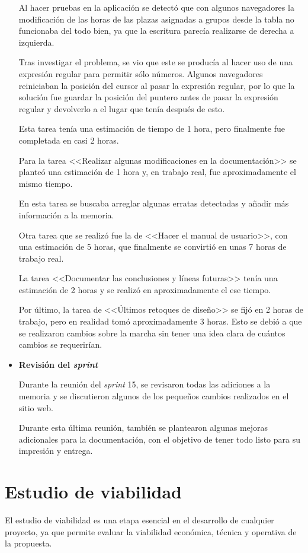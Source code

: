 \begin{itemize}
Al hacer pruebas en la aplicación se detectó que con algunos navegadores la modificación de las horas de las plazas asignadas a grupos desde la tabla no funcionaba del todo bien, ya que la escritura parecía realizarse de derecha a izquierda.

Tras investigar el problema, se vio que este se producía al hacer uso de una expresión regular para permitir sólo números. 
Algunos navegadores reiniciaban la posición del cursor al pasar la expresión regular, por lo que la solución fue guardar la posición del puntero antes de pasar la expresión regular y devolverlo a el lugar que tenía después de esto.

Esta tarea tenía una estimación de tiempo de 1 hora, pero finalmente fue completada en casi 2 horas.

Para la tarea <<Realizar algunas modificaciones en la documentación>> se planteó una estimación de 1 hora y, en trabajo real, fue aproximadamente el mismo tiempo.

En esta tarea se buscaba arreglar algunas erratas detectadas y añadir más información a la memoria.

Otra tarea que se realizó fue la de <<Hacer el manual de usuario>>, con una estimación de 5 horas, que finalmente se convirtió en unas 7 horas de trabajo real.

La tarea <<Documentar las conclusiones y líneas futuras>> tenía una estimación de 2 horas y se realizó en aproximadamente el ese tiempo.

Por último, la tarea de <<Últimos retoques de diseño>> se fijó en 2 horas de trabajo, pero en realidad tomó aproximadamente 3 horas. Esto se debió a que se realizaron cambios sobre la marcha sin tener una idea clara de cuántos cambios se requerirían.

\item\textbf{Revisión del \textit{sprint}}

Durante la reunión del \textit{sprint} 15, se revisaron todas las adiciones a la memoria y se discutieron algunos de los pequeños cambios realizados en el sitio web.

Durante esta última reunión, también se plantearon algunas mejoras adicionales para la documentación, con el objetivo de tener todo listo para su impresión y entrega.
\end{itemize}

\section{Estudio de viabilidad}
El estudio de viabilidad es una etapa esencial en el desarrollo de cualquier proyecto, ya que permite evaluar la viabilidad económica, técnica y operativa de la propuesta. 

